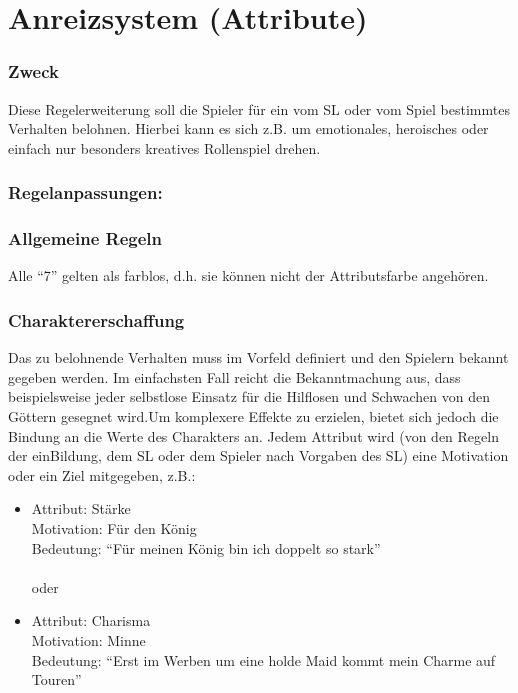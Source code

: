 \section{Anreizsystem (Attribute)}
\subsubsection{Zweck}
Diese Regelerweiterung soll die Spieler für ein vom SL oder vom Spiel bestimmtes Verhalten belohnen. Hierbei kann es sich z.B. um emotionales, heroisches oder einfach nur besonders kreatives Rollenspiel drehen.

\subsubsection{Regelanpassungen:}
\subsubsection{Allgemeine Regeln}
Alle "`7"' gelten als farblos, d.h. sie können nicht der Attributsfarbe angehören.
\subsubsection{Charaktererschaffung}
Das zu belohnende Verhalten muss im Vorfeld definiert und den Spielern bekannt gegeben werden. Im einfachsten Fall reicht die Bekanntmachung aus, dass beispielsweise jeder selbstlose Einsatz für die Hilflosen und Schwachen von den Göttern gesegnet wird.Um komplexere Effekte zu erzielen, bietet sich jedoch die Bindung an die Werte des Charakters an. Jedem Attribut wird (von den Regeln der einBildung, dem SL oder dem Spieler nach Vorgaben des SL) eine Motivation oder ein Ziel mitgegeben, z.B.:
\begin{itemize}
\item Attribut: Stärke\\
Motivation: Für den König\\
Bedeutung: "`Für meinen König bin ich doppelt so stark"'\\
\\
      oder
\item Attribut: Charisma\\
Motivation: Minne\\
Bedeutung: "`Erst im Werben um eine holde Maid kommt mein Charme auf Touren"'
\end{itemize}
